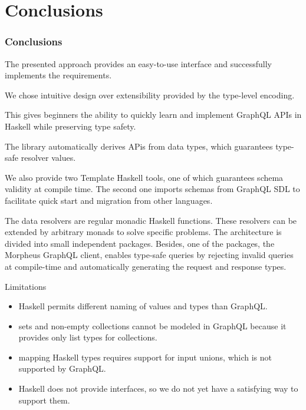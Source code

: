 \section{Conclusions}

\begin{frame}[allowframebreaks]\frametitle{Conclusions}

The presented approach provides an easy-to-use interface and successfully implements the requirements. 

We chose intuitive design over extensibility provided by the type-level encoding. 

This gives beginners the ability to quickly learn and implement GraphQL APIs in Haskell while preserving type safety.

The library automatically derives APis from data types, which guarantees type-safe resolver values. 

We also provide two Template Haskell tools, one of which guarantees schema validity at compile time. The second one imports schemas from GraphQL SDL to facilitate quick start and migration from other languages.

The data resolvers are regular monadic Haskell functions. These resolvers can be extended by arbitrary monads to solve specific problems.  The architecture is divided into small independent packages. Besides, one of the packages, the Morpheus GraphQL client, enables type-safe queries by rejecting invalid queries at compile-time and automatically generating the request and response types.
    
Limitations

\begin{itemize}
    \item Haskell permits different naming of values and types than GraphQL. 
    \item sets and non-empty collections cannot be modeled in GraphQL because it provides only list types for collections. 
    \item mapping Haskell types requires support for input unions, which is not supported by GraphQL. 
    \item Haskell does not provide interfaces, so we do not yet have a satisfying way to support them. 
\end{itemize}

\end{frame}

